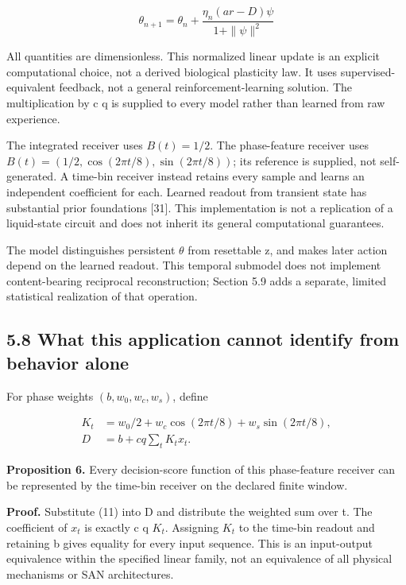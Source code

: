 \documentclass[
  american,
  11pt,
  letterpaper,
]{article}
\begin{document}
\begin{equation}
\theta_{n+1}=\theta_n+\frac{\eta_n(ar-D)\psi}{1+\|\psi\|^2}\tag{12}
\end{equation}

All quantities are dimensionless. This normalized linear update is an explicit computational choice, not a derived biological plasticity law. It uses supervised-equivalent feedback, not a general reinforcement-learning solution. The multiplication by c q is supplied to every model rather than learned from raw experience.

The integrated receiver uses \(B(t)=1/2\). The phase-feature receiver uses \(B(t)=(1/2,\cos(2\pi t/8),\sin(2\pi t/8))\); its reference is supplied, not self-generated. A time-bin receiver instead retains every sample and learns an independent coefficient for each. Learned readout from transient state has substantial prior foundations {[}31{]}. This implementation is not a replication of a liquid-state circuit and does not inherit its general computational guarantees.

The model distinguishes persistent \(\theta\) from resettable z, and makes later action depend on the learned readout. This temporal submodel does not implement content-bearing reciprocal reconstruction; Section 5.9 adds a separate, limited statistical realization of that operation.

\subsection{5.8 What this application cannot identify from behavior alone}\label{what-this-application-cannot-identify-from-behavior-alone}

For phase weights \((b,w_0,w_c,w_s)\), define

\begin{equation}
\begin{aligned}K_t&=w_0/2+w_c\cos(2\pi t/8)+w_s\sin(2\pi t/8),\\ D&=b+cq\sum_tK_tx_t.\end{aligned}\tag{13}
\end{equation}

\textbf{Proposition 6.} Every decision-score function of this phase-feature receiver can be represented by the time-bin receiver on the declared finite window.

\textbf{Proof.} Substitute (11) into D and distribute the weighted sum over t. The coefficient of \(x_t\) is exactly c q \(K_t\). Assigning \(K_t\) to the time-bin readout and retaining b gives equality for every input sequence. This is an input-output equivalence within the specified linear family, not an equivalence of all physical mechanisms or SAN architectures.
\end{document}
